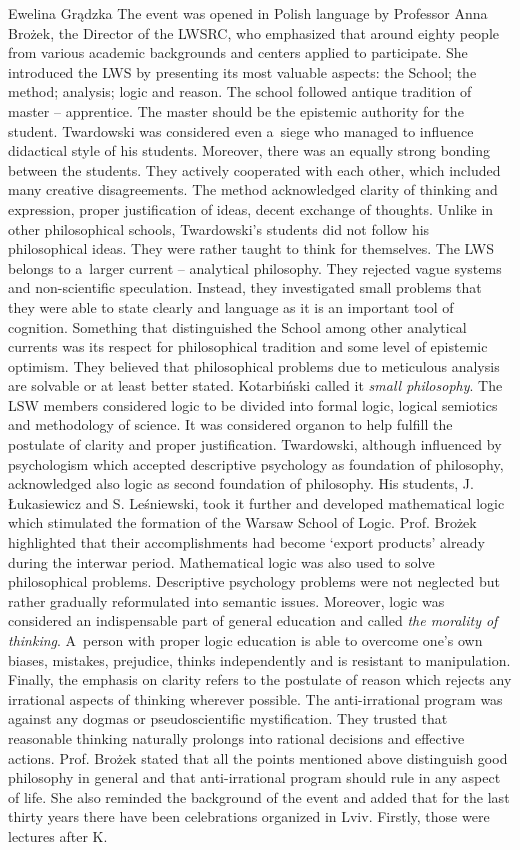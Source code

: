 \begin{editorialeng}{Ewelina Grądzka}
The event was opened in Polish language by Professor Anna Brożek, the Director of the LWSRC, who emphasized that around eighty people from various academic backgrounds and centers applied to participate. She introduced the LWS by presenting its most valuable aspects: the School; the method; analysis; logic and reason. The school followed antique tradition of master – apprentice. The master should be the epistemic authority for the student. Twardowski was considered even a~siege who managed to influence didactical style of his students. Moreover, there was an equally strong bonding between the students. They actively cooperated with each other, which included many creative disagreements. The method acknowledged clarity of thinking and expression, proper justification of ideas, decent exchange of thoughts. Unlike in other philosophical schools, Twardowski’s students did not follow his philosophical ideas. They were rather taught to think for themselves. The LWS belongs to a~larger current – analytical philosophy. They rejected vague systems and non-scientific speculation. Instead, they investigated small problems that they were able to state clearly and language as it is an important tool of cognition. Something that distinguished the School among other analytical currents was its respect for philosophical tradition and some level of epistemic optimism. They believed that philosophical problems due to meticulous analysis are solvable or at least better stated. Kotarbiński called it \textit{small philosophy}. The LSW members considered logic to be divided into formal logic, logical semiotics and methodology of science. It was considered organon to help fulfill the postulate of clarity and proper justification. Twardowski, although influenced by psychologism which accepted descriptive psychology as foundation of philosophy, acknowledged also logic as second foundation of philosophy. His students, J. Łukasiewicz and S. Leśniewski, took it further and developed mathematical logic which stimulated the formation of the Warsaw School of Logic. Prof. Brożek highlighted that their accomplishments had become ‘export products’ already during the interwar period. Mathematical logic was also used to solve philosophical problems. Descriptive psychology problems were not neglected but rather gradually reformulated into semantic issues. Moreover, logic was considered an indispensable part of general education and called \textit{the morality of thinking}. A~person with proper logic education is able to overcome one’s own biases, mistakes, prejudice, thinks independently and is resistant to manipulation. Finally, the emphasis on clarity refers to the postulate of reason which rejects any irrational aspects of thinking wherever possible. The anti-irrational program was against any dogmas or pseudoscientific mystification. They trusted that reasonable thinking naturally prolongs into rational decisions and effective actions. Prof. Brożek stated that all the points mentioned above distinguish good philosophy in general and that anti-irrational program should rule in any aspect of life. She also reminded the background of the event and added that for the last thirty years there have been celebrations organized in Lviv. Firstly, those were lectures after K. 
\end{editorialeng}
